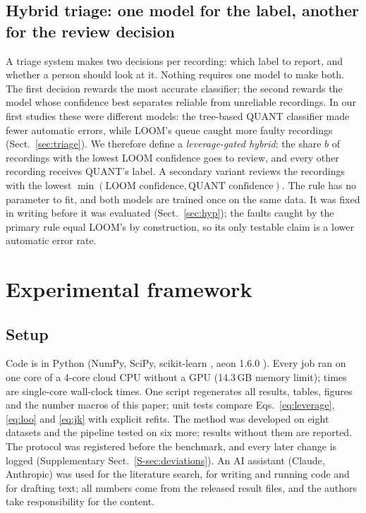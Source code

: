 \documentclass[preprint,12pt,authoryear]{elsarticle}
\begin{document}
\subsection{Hybrid triage: one model for the label, another for the review decision}\label{sec:hybrid}
A triage system makes two decisions per recording: which label to report, and whether a person should look at it. Nothing requires one model to make both. The first decision rewards the most accurate classifier; the second rewards the model whose confidence best separates reliable from unreliable recordings. In our first studies these were different models: the tree-based QUANT classifier \citep{dempster2024quant} made fewer automatic errors, while LOOM's queue caught more faulty recordings (Sect.~\ref{sec:triage}). We therefore define a \emph{leverage-gated hybrid}: the share $b$ of recordings with the lowest LOOM confidence goes to review, and every other recording receives QUANT's label. A secondary variant reviews the recordings with the lowest $\min(\text{LOOM confidence},\text{QUANT confidence})$. The rule has no parameter to fit, and both models are trained once on the same data. It was fixed in writing before it was evaluated (Sect.~\ref{sec:hyp}); the faults caught by the primary rule equal LOOM's by construction, so its only testable claim is a lower automatic error rate.

\section{Experimental framework}\label{sec:framework}

\subsection{Setup}
Code is in Python (NumPy, SciPy, scikit-learn \citep{pedregosa2011}, aeon 1.6.0 \citep{aeon2024}). Every job ran on one core of a 4-core cloud CPU without a GPU (14.3\,GB memory limit); times are single-core wall-clock times. One script regenerates all results, tables, figures and the number macros of this paper; unit tests compare Eqs.~\eqref{eq:leverage}, \eqref{eq:loo} and \eqref{eq:jk} with explicit refits. The method was developed on eight datasets and the pipeline tested on six more; results without them are reported. The protocol was registered before the benchmark, and every later change is logged (Supplementary Sect.~\ref{S-sec:deviations}). An AI assistant (Claude, Anthropic) was used for the literature search, for writing and running code and for drafting text; all numbers come from the released result files, and the authors take responsibility for the content.
\end{document}
